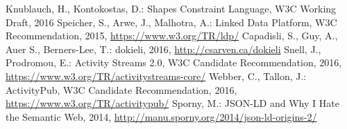 \documentclass[a4paper]{llncs}
\begin{document}
\begin{thebibliography}{99}
   Knublauch, H., Kontokostas, D.: Shapes Constraint Language, W3C Working Draft, 2016
   Speicher, S., Arwe, J., Malhotra, A.: Linked Data Platform, W3C Recommendation, 2015, \url{https://www.w3.org/TR/ldp/}
   Capadisli, S., Guy, A., Auer S., Berners-Lee, T.: dokieli, 2016, \url{http://csarven.ca/dokieli}
   Snell, J., Prodromou, E.: Activity Streams 2.0, W3C Candidate Recommendation, 2016, \url{https://www.w3.org/TR/activitystreams-core/}
   Webber, C., Tallon, J.: ActivityPub, W3C Candidate Recommendation, 2016, \url{https://www.w3.org/TR/activitypub/}
   Sporny, M.: JSON-LD and Why I Hate the Semantic Web, 2014, \url{http://manu.sporny.org/2014/json-ld-origins-2/}
\end{thebibliography}
\end{document}
